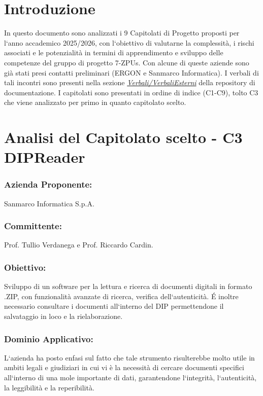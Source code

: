 \documentclass[a4paper,12pt]{article}
\begin{document}
\section{Introduzione}
In questo documento sono analizzati i 9 Capitolati di Progetto proposti per
l`anno accademico 2025/2026, con l`obiettivo di valutarne la complessità, i
rischi associati e le potenzialità in termini di apprendimento e sviluppo delle
competenze del gruppo di progetto 7-ZPUs. Con alcune di queste aziende sono già
stati presi contatti preliminari (ERGON e Sanmarco Informatica). I verbali di
tali incontri sono presenti nella sezione
\href{https://github.com/7-ZPUs/Docs/tree/main/1_Candidatura/Verbali}{\textit{Verbali/VerbaliEsterni}} della repository di documentazione. 
I capitolati sono presentati in ordine di indice (C1-C9), tolto C3 che viene analizzato per primo in quanto capitolato scelto.

\section{Analisi del Capitolato scelto - C3 DIPReader}
\subsubsection*{Azienda Proponente:} Sanmarco Informatica S.p.A.
\subsubsection*{Committente:} Prof. Tullio Verdanega e Prof. Riccardo Cardin.
\subsubsection*{Obiettivo:} Sviluppo di un software per la lettura e ricerca di documenti digitali in formato .ZIP, con funzionalità avanzate di ricerca, verifica dell`autenticità. É inoltre necessario consultare i documenti all`interno del DIP permettendone il salvataggio in loco e la rielaborazione.
\subsubsection*{Dominio Applicativo:} L`azienda ha posto enfasi sul fatto che tale strumento risulterebbe molto utile in ambiti legali e giudiziari in cui vi è la necessità di cercare documenti specifici all`interno di una mole importante di dati, garantendone l`integrità, l`autenticità, la leggibilità  e la reperibilità.
\end{document}
